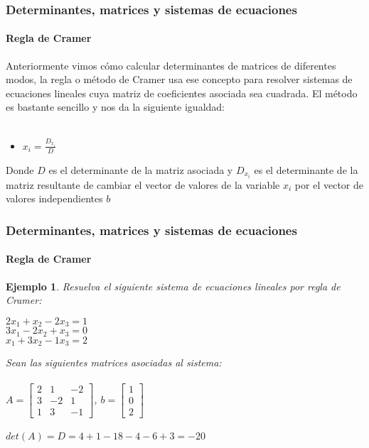\documentclass[11pt]{beamer}
\newtheorem{ejem}{Ejemplo}
\begin{document}
\begin{frame}
\frametitle{Determinantes, matrices y sistemas de ecuaciones}
\framesubtitle{Regla de Cramer}
Anteriormente vimos cómo calcular determinantes de matrices de diferentes modos, la regla o método de Cramer usa ese concepto para resolver sistemas de ecuaciones lineales cuya matriz de coeficientes asociada sea cuadrada. El método es bastante sencillo y nos da la siguiente igualdad: \\ \hspace{0cm} \\
\begin{itemize}
\item $x_i = \frac{D_{x_i}}{D}$
\end{itemize}
Donde $D$ es el determinante de la matriz asociada y $D_{x_i}$ es el determinante de la matriz resultante de cambiar el vector de valores de la variable $x_i$ por el vector de valores independientes $b$ 
\end{frame}

\begin{frame}
\frametitle{Determinantes, matrices y sistemas de ecuaciones}
\framesubtitle{Regla de Cramer}
\begin{ejem}
Resuelva el siguiente sistema de ecuaciones lineales por regla de Cramer: \\
\begin{center}
$2x_1 + x_2 - 2x_3 = 1$\\
$3x_1 - 2x_2 + x_3 = 0$\\
$x_1 + 3x_2 - 1x_3 = 2$\\ 
\end{center}
Sean las siguientes matrices asociadas al sistema: \\ \hspace{0cm} \\
$\displaystyle A = {\begin{bmatrix}2&1&-2\\3&-2&1\\1&3&-1\end{bmatrix}}$,
$\displaystyle b = {\begin{bmatrix}1\\0\\2\end{bmatrix}}$\\ \hspace{0cm} \\
$det(A) = D = 4+1-18-4-6+3 = -20$\\
\end{ejem}
\end{frame}
\end{document}
